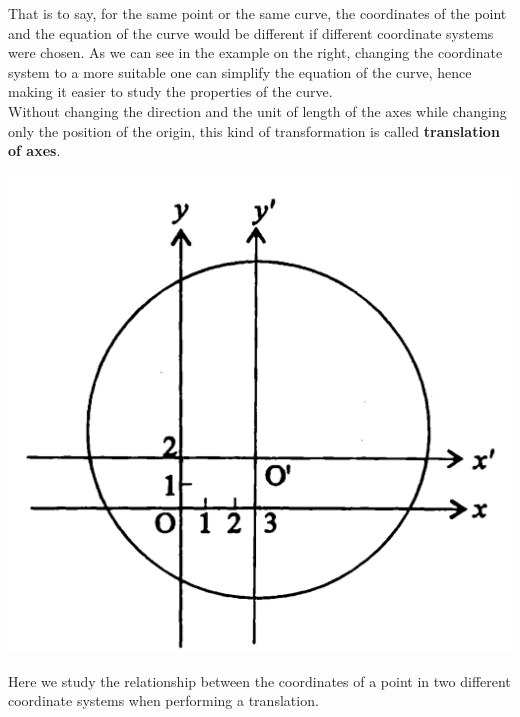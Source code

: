 \documentclass{report}
\begin{document}
\begin{multicols}{2}

    That is to say, for the same point or the same curve, the coordinates of the
    point and the equation of the curve would be different if different coordinate
    systems were chosen. As we can see in the example on the right, changing the
    coordinate system to a more suitable one can simplify the equation of the
    curve, hence making it easier to study the properties of the curve. \\
    \vspace{1em} Without changing the direction and the unit of length of the axes
    while changing only the position of the origin, this kind of transformation is
    called \textbf{translation of axes}. \columnbreak

    \begin{center}
        \includegraphics[scale=0.3]{./assets/fig1}
    \end{center}
\end{multicols}
\vspace{-1em}
Here we study the relationship between the coordinates of a point in two
different coordinate systems when performing a translation.
\end{document}
